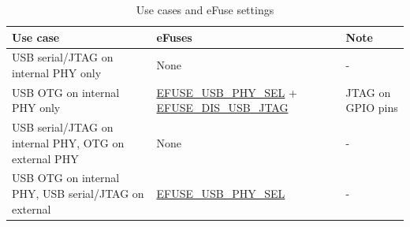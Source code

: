 \begin{table}[H]
    \centering
    \caption{Use cases and eFuse settings}
    \label{tab:usbserialjtag-efuse-setting}
    \begin{tabular} {|p{8cm}|p{4cm}|p{3cm}|}
    \hline
        \rowcolor{lightgray}
        \textbf{Use case} & \textbf{eFuses} & \textbf{Note} \\\hline
        
        USB serial/JTAG on internal PHY only & None & - \\\hline
        USB OTG on internal PHY only & \hyperref[fielddesc:EFUSEUSBPHYSEL]{EFUSE\_USB\_PHY\_SEL} + \hyperref[fielddesc:EFUSEDISUSBJTAG]{EFUSE\_DIS\_USB\_JTAG} & JTAG on GPIO pins  \\\hline
        USB serial/JTAG on internal PHY, OTG on external PHY & None & - \\\hline
        USB OTG on internal PHY, USB serial/JTAG on external & \hyperref[fielddesc:EFUSEUSBPHYSEL]{EFUSE\_USB\_PHY\_SEL} & -\\\hline
    \end{tabular}
\end{table}
